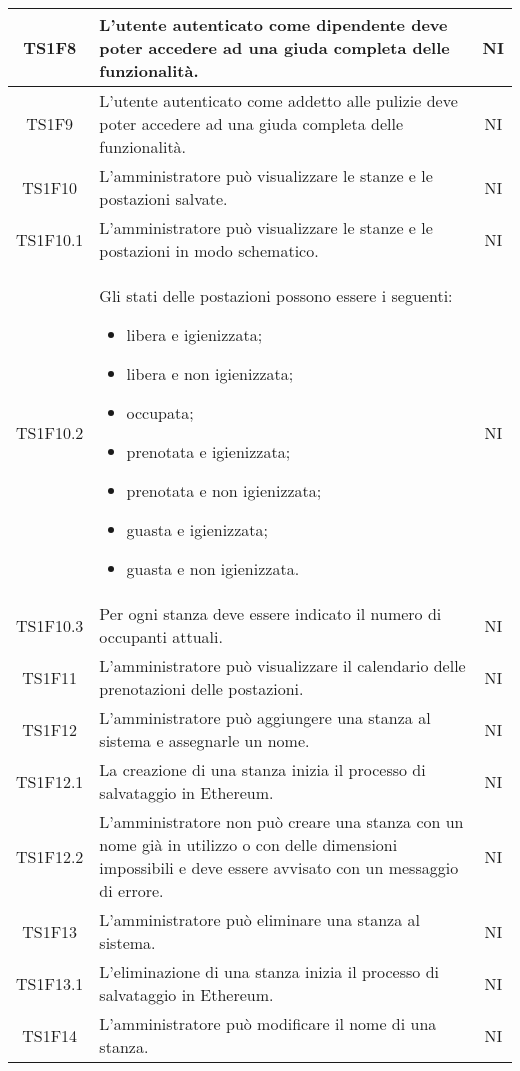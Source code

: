 \begin{center}
\begin{longtable}{|c|p{10cm}|c|}
			TS1F8 & L'utente autenticato come dipendente deve poter accedere ad una giuda completa delle funzionalità. & NI \\			
			\hline
			TS1F9 & L'utente autenticato come addetto alle pulizie deve poter accedere ad una giuda completa delle funzionalità. & NI \\
			\hline
			TS1F10 & L'amministratore può visualizzare le stanze e le postazioni salvate. & NI \\			
			\hline
			TS1F10.1 & L'amministratore può visualizzare le stanze e le postazioni in modo schematico. & NI \\			
			\hline
			TS1F10.2 & Gli stati delle postazioni possono essere i seguenti:
			 \begin{itemize}
			 	\item libera e igienizzata;
			 	\item libera e non igienizzata;
			 	\item occupata;
			 	\item prenotata e igienizzata;
			 	\item prenotata e non igienizzata;
			 	\item guasta e igienizzata;
			 	\item guasta e non igienizzata.
			 \end{itemize}
			 & NI \\			
			\hline
			TS1F10.3 & Per ogni stanza deve essere indicato il numero di occupanti attuali. & NI \\			
			\hline
			TS1F11 & L'amministratore può visualizzare il calendario delle prenotazioni delle postazioni. & NI \\			
			\hline
			TS1F12 & L'amministratore può aggiungere una stanza al sistema e assegnarle un nome. & NI \\			
			\hline
			TS1F12.1 & La creazione di una stanza inizia il processo di salvataggio in Ethereum. & NI \\			
			\hline
			TS1F12.2 & L'amministratore non può creare una stanza con un nome già in utilizzo o con delle dimensioni impossibili e deve essere avvisato con un messaggio di errore. & NI \\			
			\hline
			TS1F13 & L'amministratore può eliminare una stanza al sistema. & NI \\			
			\hline
			TS1F13.1 & L'eliminazione di una stanza inizia il processo di salvataggio in Ethereum. & NI \\			
			\hline
			TS1F14 & L'amministratore può modificare il nome di una stanza. & NI \\			

\end{longtable}
\end{center}
